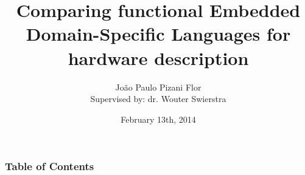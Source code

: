 \documentclass{beamer}
\title[Comparing functional EDSLs for hardware description]{Comparing functional Embedded Domain-Specific Languages for hardware description}
\date{February 13th, 2014}
\author[J. P. Pizani Flor]
{
    João Paulo Pizani Flor \\
    {\small Supervised by: dr. Wouter Swierstra}
}
\institute[Utrecht University]
{
    Department of Information and Computing Sciences,
    Utrecht University
}
\begin{document}
    \begin{frame}
        \titlepage
    \end{frame}

    \begin{frame}
        \frametitle{Table of Contents}
        \tableofcontents
    \end{frame}


    
    
    
    
    
\end{document}
